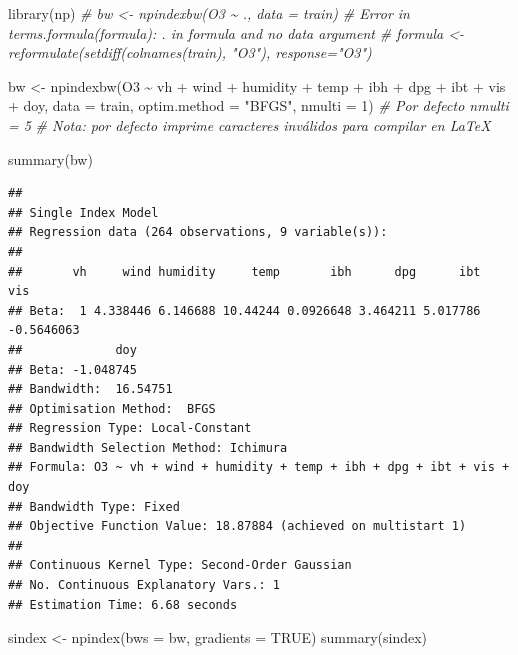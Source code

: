 \documentclass[
  spanish,
]{book}
\newenvironment{Shaded}{\begin{snugshade}}{\end{snugshade}}
\newcommand{\AttributeTok}[1]{\textcolor[rgb]{0.77,0.63,0.00}{#1}}
\newcommand{\CommentTok}[1]{\textcolor[rgb]{0.56,0.35,0.01}{\textit{#1}}}
\newcommand{\ConstantTok}[1]{\textcolor[rgb]{0.00,0.00,0.00}{#1}}
\newcommand{\DecValTok}[1]{\textcolor[rgb]{0.00,0.00,0.81}{#1}}
\newcommand{\FunctionTok}[1]{\textcolor[rgb]{0.00,0.00,0.00}{#1}}
\newcommand{\NormalTok}[1]{#1}
\newcommand{\OtherTok}[1]{\textcolor[rgb]{0.56,0.35,0.01}{#1}}
\newcommand{\SpecialCharTok}[1]{\textcolor[rgb]{0.00,0.00,0.00}{#1}}
\newcommand{\StringTok}[1]{\textcolor[rgb]{0.31,0.60,0.02}{#1}}
\theoremstyle{break}
\theoremstyle{definition}
\theoremstyle{definition}
\theoremstyle{definition}
\theoremstyle{definition}
\theoremstyle{remark}
\begin{document}
\begin{Shaded}
\begin{Highlighting}[]
\FunctionTok{library}\NormalTok{(np)}
\CommentTok{\# bw \textless{}{-} npindexbw(O3 \textasciitilde{} ., data = train)}
\CommentTok{\# Error in terms.formula(formula): \textquotesingle{}.\textquotesingle{} in formula and no \textquotesingle{}data\textquotesingle{} argument}
\CommentTok{\# formula \textless{}{-} reformulate(setdiff(colnames(train), "O3"), response="O3")}

\NormalTok{bw }\OtherTok{\textless{}{-}} \FunctionTok{npindexbw}\NormalTok{(O3 }\SpecialCharTok{\textasciitilde{}}\NormalTok{ vh }\SpecialCharTok{+}\NormalTok{ wind }\SpecialCharTok{+}\NormalTok{ humidity }\SpecialCharTok{+}\NormalTok{ temp }\SpecialCharTok{+}\NormalTok{ ibh }\SpecialCharTok{+}\NormalTok{ dpg }\SpecialCharTok{+}\NormalTok{ ibt }\SpecialCharTok{+}\NormalTok{ vis }\SpecialCharTok{+}\NormalTok{ doy,}
                \AttributeTok{data =}\NormalTok{ train, }\AttributeTok{optim.method =} \StringTok{"BFGS"}\NormalTok{, }\AttributeTok{nmulti =} \DecValTok{1}\NormalTok{) }\CommentTok{\# Por defecto nmulti = 5}
\CommentTok{\# Nota: por defecto imprime caracteres inválidos para compilar en LaTeX}
\end{Highlighting}
\end{Shaded}

\begin{Shaded}
\begin{Highlighting}[]
\FunctionTok{summary}\NormalTok{(bw)}
\end{Highlighting}
\end{Shaded}

\begin{verbatim}
## 
## Single Index Model
## Regression data (264 observations, 9 variable(s)):
## 
##       vh     wind humidity     temp       ibh      dpg      ibt        vis
## Beta:  1 4.338446 6.146688 10.44244 0.0926648 3.464211 5.017786 -0.5646063
##             doy
## Beta: -1.048745
## Bandwidth:  16.54751
## Optimisation Method:  BFGS
## Regression Type: Local-Constant
## Bandwidth Selection Method: Ichimura
## Formula: O3 ~ vh + wind + humidity + temp + ibh + dpg + ibt + vis + doy
## Bandwidth Type: Fixed
## Objective Function Value: 18.87884 (achieved on multistart 1)
## 
## Continuous Kernel Type: Second-Order Gaussian
## No. Continuous Explanatory Vars.: 1
## Estimation Time: 6.68 seconds
\end{verbatim}

\begin{Shaded}
\begin{Highlighting}[]
\NormalTok{sindex }\OtherTok{\textless{}{-}} \FunctionTok{npindex}\NormalTok{(}\AttributeTok{bws =}\NormalTok{ bw, }\AttributeTok{gradients =} \ConstantTok{TRUE}\NormalTok{)}
\FunctionTok{summary}\NormalTok{(sindex)}
\end{Highlighting}
\end{Shaded}
\end{document}

